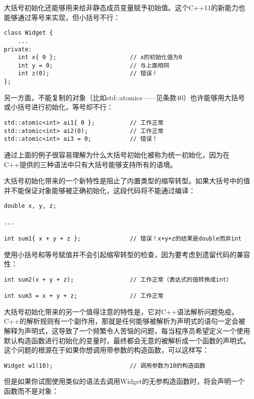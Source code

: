 大括号初始化还能够用来给非静态成员变量赋予初始值。这个C++11的新能力也能够通过等号来实现，但小括号不行：

\begin{lstlisting}
class Widget {
	...
private:
	int x{ 0 };						// x的初始化值为0
	int y = 0;						// 与上面相同
	int z(0);						// 错误！
};
\end{lstlisting}

另一方面，不能复制的对象（比如std::atomics——见条款40）也许能够用大括号或小括号进行初始化，等号却不行：

\begin{lstlisting}
std::atomic<int> ai1{ 0 };			// 工作正常
std::atomic<int> ai2(0);			// 工作正常
std::atomic<int> ai3 = 0;			// 错误！
\end{lstlisting}

通过上面的例子很容易理解为什么大括号初始化被称为统一初始化，因为在C++提供的三种语法中只有大括号能够支持所有的语境。

大括号初始化带来的一个新特性是阻止了内置类型的缩窄转型。如果大括号中的值并不能保证对象能够被正确初始化，这段代码将不能通过编译：

\begin{lstlisting}
double x, y, z;

...

int sum1{ x + y + z };				// 错误！x+y+z的结果是double而非int
\end{lstlisting}

使用小括号和等号赋值并不会引起缩窄转型的检查，因为要考虑到遗留代码的兼容性：

\begin{lstlisting}
int sum2(x + y + z); 				// 工作正常（表达式的值转换成int）

int sum3 = x + y + z; 				// 工作正常
\end{lstlisting}

大括号初始化带来的另一个值得注意的特性是，它对C++语法解析问题免疫。C++的解析规则有一个副作用，那就是任何能够被解析为声明式的语句一定会被解释为声明式，这导致了一个频繁令人苦恼的问题，每当程序员希望定义一个使用默认构造函数进行初始化的变量时，最终都会无意的被解析成一个函数的声明式。这个问题的根源在于如果你想调用带参数的构造函数，可以这样写：

\begin{lstlisting}
Widget w1(10);						// 调用参数为10的构造函数
\end{lstlisting}

但是如果你试图使用类似的语法去调用Widget的无参构造函数时，将会声明一个函数而不是对象：

